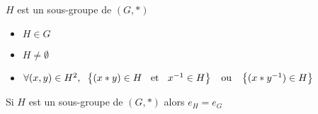\begin{dfn}
$H$ est un sous-groupe de $(G, *)$ \ssi
\begin{itemize}
    \item $H \in G$
    \item $H \neq \emptyset$
    \item $\forall (x, y) \in H^2, \;\;
    \left\{(x * y) \in H \;\;\text{ et }\;\; x^{-1} \in H\right\}
    \;\;\text{ ou }\;\; \left\{(x * y^{-1}) \in H\right\}$
\end{itemize}
\end{dfn}

\begin{rem}
Si $H$ est un sous-groupe de $(G, *)$ alors $e_H = e_G$
\end{rem}



